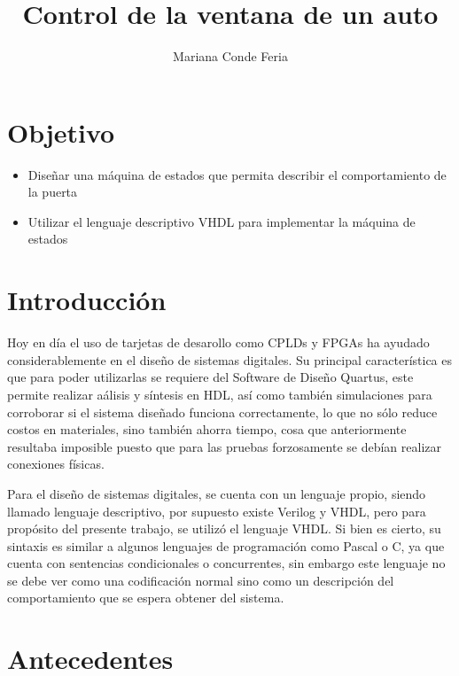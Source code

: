 \documentclass{article}
\title{Control de la ventana de un auto}
\author{Mariana Conde Feria}
\begin{document}
\maketitle

\section{Objetivo}
\begin{itemize}
    \item Diseñar una máquina de estados que permita describir el comportamiento de la puerta
    \item Utilizar el lenguaje descriptivo VHDL para implementar la máquina de estados 
    
\end{itemize}
\section{Introducción}
Hoy en día el uso de tarjetas de desarollo como CPLDs y FPGAs ha ayudado considerablemente en el diseño de sistemas digitales. Su principal característica es que para poder utilizarlas se requiere del Software de Diseño Quartus, este permite realizar aálisis y síntesis en HDL, así como también simulaciones para corroborar si el sistema diseñado funciona correctamente, lo que no sólo reduce costos en materiales, sino también ahorra tiempo, cosa que anteriormente resultaba imposible puesto que para las pruebas forzosamente se debían realizar conexiones físicas. 

Para el diseño de sistemas digitales, se cuenta con un lenguaje propio, siendo llamado lenguaje descriptivo, por supuesto existe Verilog y VHDL, pero para propósito del presente trabajo, se utilizó el lenguaje VHDL. Si bien es cierto, su sintaxis es similar a algunos lenguajes de programación como Pascal o C, ya que cuenta con sentencias condicionales o concurrentes, sin embargo este lenguaje no se debe ver como una codificación normal sino como un descripción del comportamiento que se espera obtener del sistema.
\section{Antecedentes}
\end{document}
